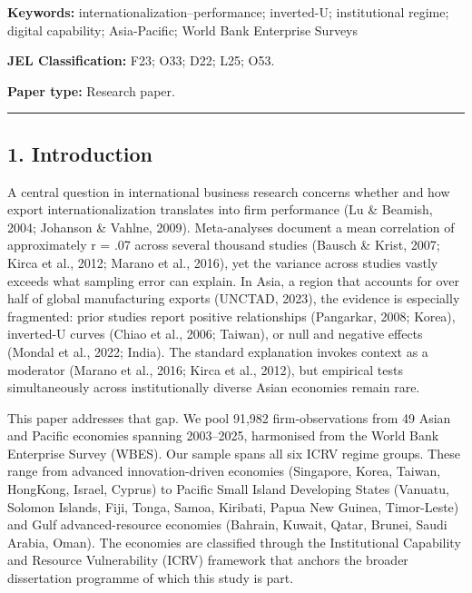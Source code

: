 \documentclass[12pt,a4paper]{article}
\begin{document}
\textbf{Keywords:} internationalization--performance; inverted-U;
institutional regime; digital capability; Asia-Pacific; World Bank
Enterprise Surveys

\textbf{JEL Classification:} F23; O33; D22; L25; O53.

\textbf{Paper type:} Research paper.

\begin{center}\rule{0.5\linewidth}{0.5pt}\end{center}

\hypertarget{1-introduction}{%
\subsection{1. Introduction}\label{1-introduction}}

A central question in international business research concerns whether
and how export internationalization translates into firm performance (Lu
\& Beamish, 2004; Johanson \& Vahlne, 2009). Meta-analyses document a
mean correlation of approximately r = .07 across several thousand
studies (Bausch \& Krist, 2007; Kirca et al., 2012; Marano et al.,
2016), yet the variance across studies vastly exceeds what sampling
error can explain. In Asia, a region that accounts for over half of
global manufacturing exports (UNCTAD, 2023), the evidence is especially
fragmented: prior studies report positive relationships (Pangarkar,
2008; Korea), inverted-U curves (Chiao et al., 2006; Taiwan), or null
and negative effects (Mondal et al., 2022; India). The standard
explanation invokes context as a moderator (Marano et al., 2016; Kirca
et al., 2012), but empirical tests simultaneously across institutionally
diverse Asian economies remain rare.

This paper addresses that gap. We pool 91,982 firm-observations from 49
Asian and Pacific economies spanning 2003--2025, harmonised from the
World Bank Enterprise Survey (WBES). Our sample spans all six ICRV
regime groups. These range from advanced innovation-driven economies
(Singapore, Korea, Taiwan, HongKong, Israel, Cyprus) to Pacific Small
Island Developing States (Vanuatu, Solomon Islands, Fiji, Tonga, Samoa,
Kiribati, Papua New Guinea, Timor-Leste) and Gulf advanced-resource
economies (Bahrain, Kuwait, Qatar, Brunei, Saudi Arabia, Oman). The
economies are classified through the Institutional Capability and
Resource Vulnerability (ICRV) framework that anchors the broader
dissertation programme of which this study is part.
\end{document}
